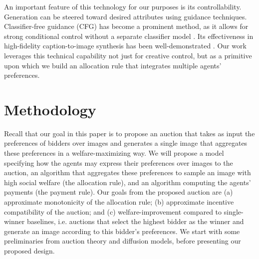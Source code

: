 \documentclass[format=acmsmall, review=false]{acmart}
\begin{document}
An important feature of this technology for our purposes is its controllability. Generation can be steered toward desired attributes using guidance techniques. Classifier-free guidance (CFG) has become a prominent method, as it allows for strong conditional control without a separate classifier model \citep{ho2022cfg}. Its effectiveness in high-fidelity caption-to-image synthesis has been well-demonstrated \citep{saharia2022photorealistictexttoimagediffusionmodels, nichol2022glidephotorealisticimagegeneration}. Our work leverages this technical capability not just for creative control, but as a primitive upon which we build an allocation rule that integrates multiple agents' preferences.



\section{Methodology}

Recall that our goal in this paper is to propose an auction that takes as input the preferences of bidders over images and generates a single image that aggregates these preferences in a welfare-maximizing way. We will propose a model specifying how the agents may express their preferences over images to the auction, an algorithm that aggregates these preferences to sample an image with high social welfare (the allocation rule), and an algorithm computing the agents' payments (the payment rule). Our goals from the proposed auction are (a) approximate monotonicity of the allocation rule; (b) approximate incentive compatibility of the auction; and (c) welfare-improvement compared to single-winner baselines, i.e. auctions that select the highest bidder as the winner and generate an image according to this bidder's preferences. We start with some preliminaries from auction theory and diffusion models, before presenting our proposed design.
\end{document}
